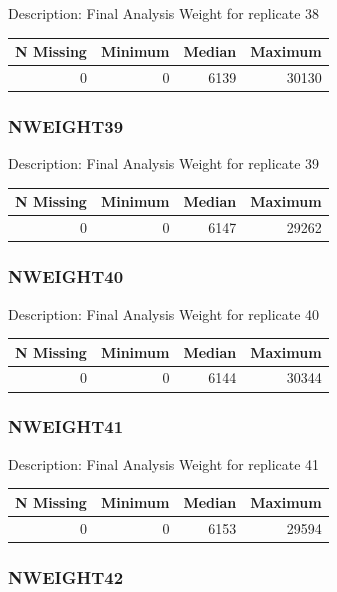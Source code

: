 \documentclass[
]{krantz}
\begin{document}
Description: Final Analysis Weight for replicate 38

\begin{tabular}[t]{r|r|r|r}
\hline
N Missing & Minimum & Median & Maximum\\
\hline
0 & 0 & 6139 & 30130\\
\hline
\end{tabular}

\hypertarget{nweight39}{%
\subsubsection*{NWEIGHT39}\label{nweight39}}


Description: Final Analysis Weight for replicate 39

\begin{tabular}[t]{r|r|r|r}
\hline
N Missing & Minimum & Median & Maximum\\
\hline
0 & 0 & 6147 & 29262\\
\hline
\end{tabular}

\hypertarget{nweight40}{%
\subsubsection*{NWEIGHT40}\label{nweight40}}


Description: Final Analysis Weight for replicate 40

\begin{tabular}[t]{r|r|r|r}
\hline
N Missing & Minimum & Median & Maximum\\
\hline
0 & 0 & 6144 & 30344\\
\hline
\end{tabular}

\hypertarget{nweight41}{%
\subsubsection*{NWEIGHT41}\label{nweight41}}


Description: Final Analysis Weight for replicate 41

\begin{tabular}[t]{r|r|r|r}
\hline
N Missing & Minimum & Median & Maximum\\
\hline
0 & 0 & 6153 & 29594\\
\hline
\end{tabular}

\hypertarget{nweight42}{%
\subsubsection*{NWEIGHT42}\label{nweight42}}
\end{document}
